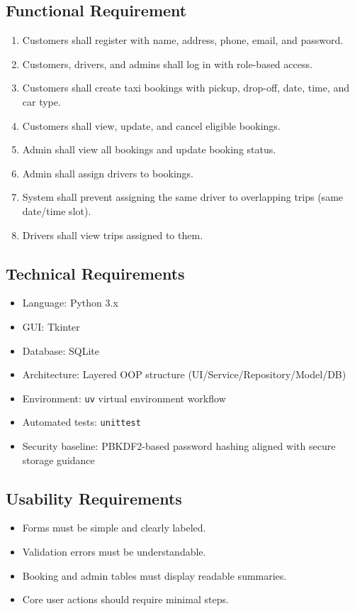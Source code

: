\documentclass[12pt,a4paper]{article}
\begin{document}
\subsection{Functional Requirement}
\begin{enumerate}[label=FR-\arabic*., noitemsep]
    \item Customers shall register with name, address, phone, email, and password.
    \item Customers, drivers, and admins shall log in with role-based access.
    \item Customers shall create taxi bookings with pickup, drop-off, date, time, and car type.
    \item Customers shall view, update, and cancel eligible bookings.
    \item Admin shall view all bookings and update booking status.
    \item Admin shall assign drivers to bookings.
    \item System shall prevent assigning the same driver to overlapping trips (same date/time slot).
    \item Drivers shall view trips assigned to them.
\end{enumerate}

\subsection{Technical Requirements}
\begin{itemize}[noitemsep]
    \item Language: Python 3.x
    \item GUI: Tkinter
    \item Database: SQLite
    \item Architecture: Layered OOP structure (UI/Service/Repository/Model/DB)
    \item Environment: \texttt{uv} virtual environment workflow
    \item Automated tests: \texttt{unittest}
    \item Security baseline: PBKDF2-based password hashing aligned with secure storage guidance \citep{owasp}
\end{itemize}

\subsection{Usability Requirements}
\begin{itemize}[noitemsep]
    \item Forms must be simple and clearly labeled.
    \item Validation errors must be understandable.
    \item Booking and admin tables must display readable summaries.
    \item Core user actions should require minimal steps.
\end{itemize}
\end{document}
